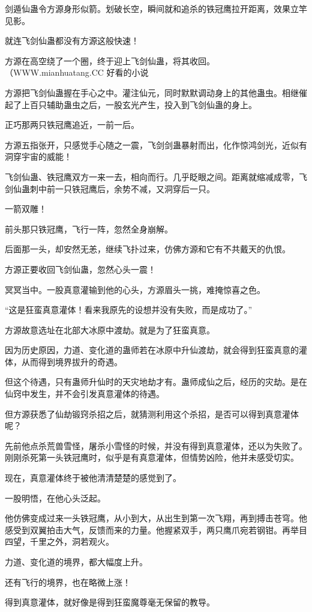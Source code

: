 \begin{this_body}
剑遁仙蛊令方源身形似箭。划破长空，瞬间就和追杀的铁冠鹰拉开距离，效果立竿见影。

就连飞剑仙蛊都没有方源这般快速！

方源在高空绕了一个圈，终于迎上飞剑仙蛊，将其收回。（WWW.mianhuatang.CC 好看的小说

方源把飞剑仙蛊握在手心之中。灌注仙元，同时默默调动身上的其他蛊虫。相继催起了上百只辅助蛊虫之后，一股玄光产生，投入到飞剑仙蛊的身上。

正巧那两只铁冠鹰追近，一前一后。

方源五指张开，只感觉手心随之一震，飞剑剑蛊暴射而出，化作惊鸿剑光，近似有洞穿宇宙的威能！

飞剑仙蛊、铁冠鹰双方一来一去，相向而行。几乎眨眼之间。距离就缩减成零，飞剑仙蛊刺中前一只铁冠鹰后，余势不减，又洞穿后一只。

一箭双雕！

前头那只铁冠鹰，飞行一阵，忽然全身崩解。

后面那一头，却安然无恙，继续飞扑过来，仿佛方源和它有不共戴天的仇恨。

方源正要收回飞剑仙蛊，忽然心头一震！

冥冥当中。一股真意灌输到他的心头，方源眉头一挑，难掩惊喜之色。

“这是狂蛮真意灌体！看来我原先的设想并没有失败，而是成功了。”

方源故意选址在北部大冰原中渡劫。就是为了狂蛮真意。

因为历史原因，力道、变化道的蛊师若在冰原中升仙渡劫，就会得到狂蛮真意的灌体，从而得到境界拔升的奇遇。

但这个待遇，只有蛊师升仙时的天灾地劫才有。蛊师成仙之后，经历的灾劫。是在仙窍中发生，并不会引发真意灌体的待遇。

但方源获悉了仙劫锻窍杀招之后，就猜测利用这个杀招，是否可以得到真意灌体呢？

先前他点杀荒兽雪怪，屠杀小雪怪的时候，并没有得到真意灌体，还以为失败了。刚刚杀死第一头铁冠鹰时，似乎是有真意灌体，但情势凶险，他并未感受切实。

现在，真意灌体终于被他清清楚楚的感觉到了。

一股明悟，在他心头泛起。

他仿佛变成过来一头铁冠鹰，从小到大，从出生到第一次飞翔，再到搏击苍穹。他感受到双翼拍击大气，反馈而来的力量。他握紧双手，两只鹰爪宛若钢钳。再举目四望，千里之外，洞若观火。

力道、变化道的境界，都大幅度上升。

还有飞行的境界，也在略微上涨！

得到真意灌体，就好像是得到狂蛮魔尊毫无保留的教导。


\end{this_body}
